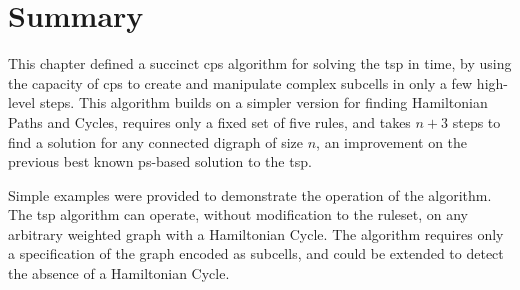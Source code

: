\section{\label{sec:tsp:conc}Summary}
This chapter defined a succinct \gls{cps} algorithm for solving the \gls{tsp} in  time, by using the capacity of \gls{cps} to create and manipulate complex subcells in only a few high-level steps.  This algorithm builds on a simpler version for finding Hamiltonian Paths and Cycles, requires only a fixed set of five rules, and takes \(n + 3\) steps to find a solution for any connected digraph of size \(n\), an improvement on the previous best known \gls{ps}-based solution to the \gls{tsp}.

Simple examples were provided to demonstrate the operation of the algorithm.  The \gls{tsp} algorithm can operate, without modification to the \gls{ruleset}, on any arbitrary weighted graph with a Hamiltonian Cycle.   The algorithm requires only a specification of the graph encoded as subcells, and could be extended to detect the absence of a Hamiltonian Cycle.

